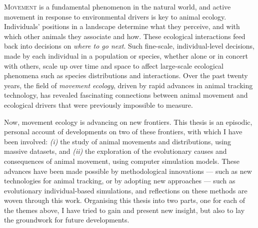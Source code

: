 \label{ch:abstract}


\lettrine{M}{ovement} is a fundamental phenomenon in the natural world, and active movement in response to environmental drivers is key to animal ecology.
Individuals' positions in a landscape determine what they perceive, and with which other animals they associate and how.
These ecological interactions feed back into decisions on \textit{where to go next}.
Such fine-scale, individual-level decisions, made by each individual in a population or species, whether alone or in concert with others, scale up over time and space to affect large-scale ecological phenomena such as species distributions and interactions.
Over the past twenty years, the field of \textit{movement ecology}, driven by rapid advances in animal tracking technology, has revealed fascinating connections between animal movement and ecological drivers that were previously impossible to measure.

Now, movement ecology is advancing on new frontiers.%
This thesis is an episodic, personal account of developments on two of these frontiers, with which I have been involved: \textit{(i)} the study of animal movements and distributions, using massive datasets, and \textit{(ii)} the exploration of the evolutionary causes and consequences of animal movement, using computer simulation models.
These advances have been made possible by methodological innovations --- such as new technologies for animal tracking, or by adopting new approaches --- such as evolutionary individual-based simulations, and reflections on these methods are woven through this work. 
Organising this thesis into two parts, one for each of the themes above, I have tried to gain and present new insight, but also to lay the groundwork for future developments.

